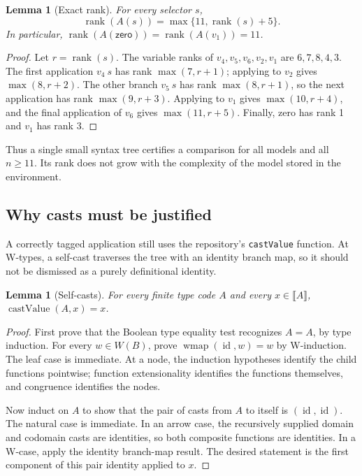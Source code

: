 \documentclass[11pt,letterpaper]{article}
\newtheorem{lemma}[theorem]{Lemma}
\theoremstyle{definition}
\newcommand{\rank}{\operatorname{rank}}
\newcommand{\code}[1]{\texttt{#1}}
\begin{document}
\begin{lemma}[Exact rank]\label{lem:rank11}
For every selector $s$,
\[
 \rank(A(s))=\max\{11,\rank(s)+5\}.
\]
In particular, $\rank(A(\mathsf{zero}))=
\rank(A(v_1))=11$.
\end{lemma}
\begin{proof}
Let $r=\rank(s)$. The variable ranks of $v_4,v_5,v_6,v_2,v_1$ are
$6,7,8,4,3$. The first application $v_4\ s$ has rank
$\max(7,r+1)$; applying to $v_2$ gives $\max(8,r+2)$.
The other branch $v_5\ s$ has rank $\max(8,r+1)$, so the next application
has rank $\max(9,r+3)$. Applying to $v_1$ gives
$\max(10,r+4)$, and the final application of $v_6$ gives
$\max(11,r+5)$. Finally, zero has rank 1 and $v_1$ has rank 3.
\end{proof}

Thus a single small syntax tree certifies a comparison for all models and all
$n\ge11$. Its rank does not grow with the complexity of the model stored in
the environment.

\subsection{Why casts must be justified}

A correctly tagged application still uses the repository's \code{castValue}
function. At W-types, a self-cast traverses the tree with an identity branch
map, so it should not be dismissed as a purely definitional identity.

\begin{lemma}[Self-casts]\label{lem:casts}
For every finite type code $A$ and every $x\in\llbracket A\rrbracket$,
$\operatorname{castValue}(A,x)=x$.
\end{lemma}
\begin{proof}
First prove that the Boolean type equality test recognizes $A=A$, by type
induction. For every $w\in W(B)$, prove
$\operatorname{wmap}(\operatorname{id},w)=w$ by W-induction. The leaf case is
immediate. At a node, the induction hypotheses identify the child functions
pointwise; function extensionality identifies the functions themselves, and
congruence identifies the nodes.

Now induct on $A$ to show that the pair of casts from $A$ to itself is
$(\operatorname{id},\operatorname{id})$. The natural case is immediate. In
an arrow case, the recursively supplied domain and codomain casts are
identities, so both composite functions are identities. In a W-case, apply
the identity branch-map result. The desired statement is the first component
of this pair identity applied to $x$.
\end{proof}
\end{document}
